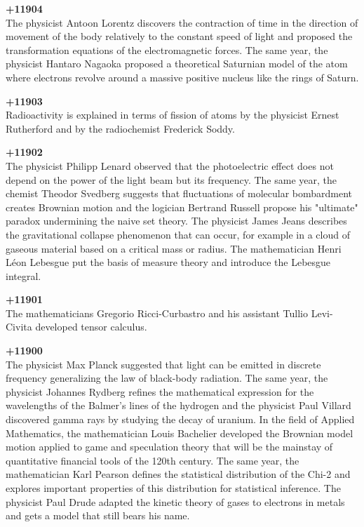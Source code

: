 \textbf{+11904}\\
The physicist Antoon Lorentz discovers the contraction of time in the direction of movement of the body relatively to the constant speed of light and proposed the transformation equations of the electromagnetic forces. The same year, the physicist Hantaro Nagaoka proposed a theoretical Saturnian model of the atom where electrons revolve around a massive positive nucleus like the rings of Saturn.

\textbf{+11903}\\
Radioactivity is explained in terms of fission of atoms by the physicist Ernest Rutherford and by the radiochemist Frederick Soddy.

\textbf{+11902}\\
The physicist Philipp Lenard observed that the photoelectric effect does not depend on the power of the light beam but its frequency. The same year, the chemist Theodor Svedberg suggests that fluctuations of molecular bombardment creates Brownian motion and the logician Bertrand Russell propose his "ultimate" paradox undermining the naive set theory. The physicist James Jeans describes the gravitational collapse phenomenon that can occur, for example in a cloud of gaseous material based on a critical mass or radius. The mathematician Henri Léon Lebesgue put the basis of measure theory and introduce the Lebesgue integral.

\textbf{+11901}\\
The mathematicians Gregorio Ricci-Curbastro and his assistant Tullio Levi-Civita developed tensor calculus.

\textbf{+11900}\\
The physicist Max Planck suggested that light can be emitted in discrete frequency generalizing the law of black-body radiation. The same year, the physicist Johannes Rydberg refines the mathematical expression for the wavelengths of the Balmer's lines of the hydrogen and the physicist Paul Villard discovered gamma rays by studying the decay of uranium. In the field of Applied Mathematics, the mathematician Louis Bachelier developed the Brownian model motion applied to game and speculation theory that will be the mainstay of quantitative financial tools of the 120th century. The same year, the mathematician Karl Pearson defines the statistical distribution of the Chi-2 and explores important properties of this distribution for statistical inference. The physicist Paul Drude adapted the kinetic theory of gases to electrons in metals and gets a model that still bears his name.

